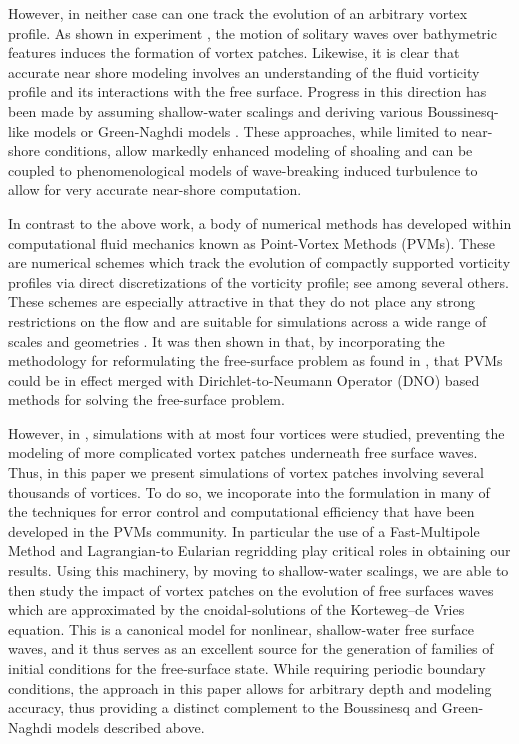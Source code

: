 \documentclass[a4paper,11pt]{article}
\begin{document}
However, in neither case can one track the evolution of an arbitrary vortex profile.  As shown in experiment \cite{liu1,liu2,lin}, the motion of solitary waves over bathymetric features induces the formation of vortex patches.  Likewise, it is clear that accurate near shore modeling involves an understanding of the fluid vorticity profile and its interactions with the free surface.  Progress in this direction has been made by assuming shallow-water scalings and deriving various Boussinesq-like models \cite{nwogu1,chen,zhang} or Green-Naghdi models \cite{Lannes2014_1,Lannes2014_2,Lannes2016_1}.  These approaches, while limited to near-shore conditions, allow markedly enhanced modeling of shoaling and can be coupled to phenomenological models of wave-breaking induced turbulence to allow for very accurate near-shore computation.  

In contrast to the above work, a body of numerical methods has developed within computational fluid mechanics known as Point-Vortex Methods (PVMs).  These are numerical schemes which track the evolution of compactly supported vorticity profiles via direct discretizations of the vorticity profile; see \cite{cottet,koumoutsakos,koumoutsakos2,krasny,beale,majda} among several others.  These schemes are especially attractive in that they do not place any strong restrictions on the flow and are suitable for simulations across a wide range of scales and geometries \cite{koumoutsakos3,koumoutsakos4}.  It was then shown in \cite{curtis} that, by incorporating the methodology for reformulating the free-surface problem as found in \cite{afm}, that PVMs could be in effect merged with Dirichlet-to-Neumann Operator (DNO) based methods \cite{craig,guyenne} for solving the free-surface problem.  

However, in \cite{curtis}, simulations with at most four vortices were studied, preventing the modeling of more complicated vortex patches underneath free surface waves.  Thus, in this paper we present simulations of vortex patches involving several thousands of vortices.  To do so, we incoporate into the formulation in \cite{curtis} many of the techniques for error control and computational efficiency that have been developed in the PVMs community.  In particular the use of a Fast-Multipole Method \cite{greengard} and Lagrangian-to Eularian regridding \cite{koumoutsakos} play critical roles in obtaining our results.  Using this machinery, by moving to shallow-water scalings, we are able to then study the impact of vortex patches on the evolution of free surfaces waves which are approximated by the cnoidal-solutions of the Korteweg--de Vries equation.  This is a canonical model for nonlinear, shallow-water free surface waves, and it thus serves as an excellent source for the generation of families of initial conditions for the free-surface state.  While requiring periodic boundary conditions, the approach in this paper allows for arbitrary depth and modeling accuracy, thus providing a distinct complement to the Boussinesq and Green-Naghdi models described above.
\end{document}

